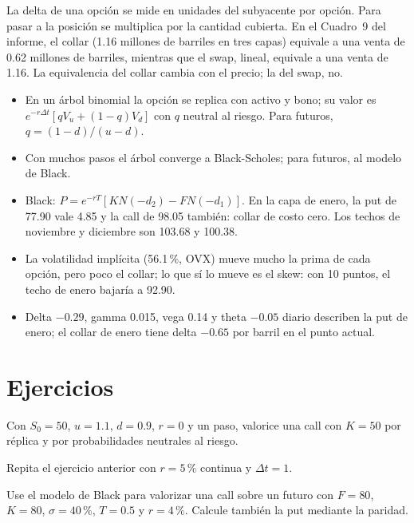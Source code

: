 \begin{cuidado}
La delta de una opción se mide en unidades del subyacente por opción. Para pasar a la posición se multiplica por la cantidad cubierta. En el Cuadro~9 del informe, el collar (1.16 millones de barriles en tres capas) equivale a una venta de 0.62 millones de barriles, mientras que el swap, lineal, equivale a una venta de 1.16. La equivalencia del collar cambia con el precio; la del swap, no.
\end{cuidado}

\begin{resumen}
\begin{itemize}
\item En un árbol binomial la opción se replica con activo y bono; su valor es $e^{-r\Delta t}[qV_u+(1-q)V_d]$ con $q$ neutral al riesgo. Para futuros, $q=(1-d)/(u-d)$.
\item Con muchos pasos el árbol converge a Black-Scholes; para futuros, al modelo de Black.
\item Black: $P=e^{-rT}[KN(-d_2)-FN(-d_1)]$. En la capa de enero, la put de 77.90 vale 4.85 y la call de 98.05 también: collar de costo cero. Los techos de noviembre y diciembre son 103.68 y 100.38.
\item La volatilidad implícita (56.1\,\%, OVX) mueve mucho la prima de cada opción, pero poco el collar; lo que sí lo mueve es el skew: con 10 puntos, el techo de enero bajaría a 92.90.
\item Delta $-0.29$, gamma 0.015, vega 0.14 y theta $-0.05$ diario describen la put de enero; el collar de enero tiene delta $-0.65$ por barril en el punto actual.
\end{itemize}
\end{resumen}

\section*{Ejercicios}

\ejercicio[cálculo] Con $S_0=50$, $u=1.1$, $d=0.9$, $r=0$ y un paso, valorice una call con $K=50$ por réplica y por probabilidades neutrales al riesgo.

\ejercicio[cálculo] Repita el ejercicio anterior con $r=5\,\%$ continua y $\Delta t=1$.

\ejercicio[cálculo] Use el modelo de Black para valorizar una call sobre un futuro con $F=80$, $K=80$, $\sigma=40\,\%$, $T=0.5$ y $r=4\,\%$. Calcule también la put mediante la paridad.

